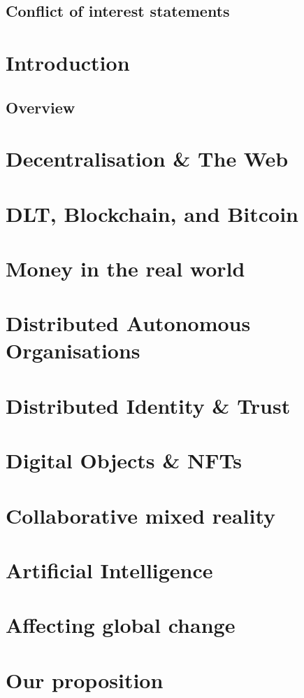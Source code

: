 \documentclass[11pt]{article}
\begin{document}
\section{Conflict of interest statements}

\chapter{Introduction}
\section{Overview}


\chapter{Decentralisation \& The Web}

\chapter{DLT, Blockchain, and Bitcoin}

\chapter{Money in the real world}

\chapter{Distributed Autonomous Organisations}

 
\chapter{Distributed Identity \& Trust}

\chapter{Digital Objects \& NFTs}

\chapter{Collaborative mixed reality}



\chapter{Artificial Intelligence}

\chapter{Affecting global change}
 

\chapter{Our proposition}

\end{document}
